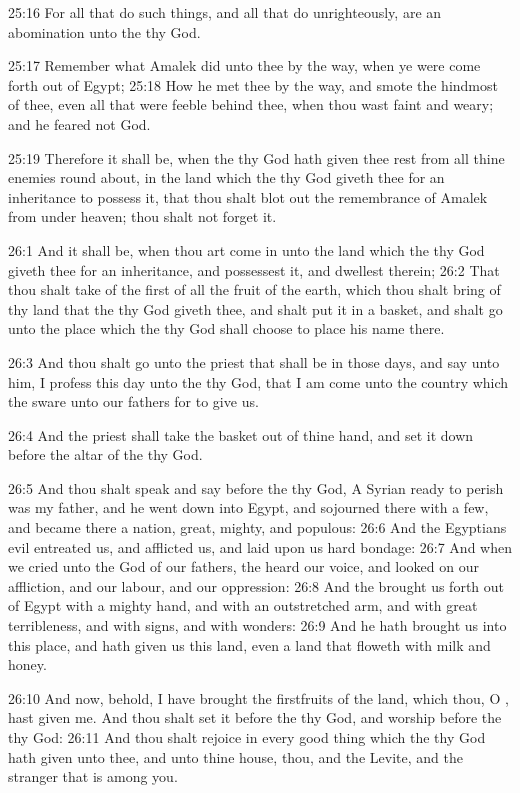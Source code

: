 25:16 For all that do such things, and all that do unrighteously, are
an abomination unto the \LORD thy God.

25:17 Remember what Amalek did unto thee by the way, when ye were come
forth out of Egypt; 25:18 How he met thee by the way, and smote the
hindmost of thee, even all that were feeble behind thee, when thou
wast faint and weary; and he feared not God.

25:19 Therefore it shall be, when the \LORD thy God hath given thee
rest from all thine enemies round about, in the land which the \LORD
thy God giveth thee for an inheritance to possess it, that thou shalt
blot out the remembrance of Amalek from under heaven; thou shalt not
forget it.

26:1 And it shall be, when thou art come in unto the land which the
\LORD thy God giveth thee for an inheritance, and possessest it, and
dwellest therein; 26:2 That thou shalt take of the first of all the
fruit of the earth, which thou shalt bring of thy land that the \LORD
thy God giveth thee, and shalt put it in a basket, and shalt go unto
the place which the \LORD thy God shall choose to place his name there.

26:3 And thou shalt go unto the priest that shall be in those days,
and say unto him, I profess this day unto the \LORD thy God, that I am
come unto the country which the \LORD sware unto our fathers for to
give us.

26:4 And the priest shall take the basket out of thine hand, and set
it down before the altar of the \LORD thy God.

26:5 And thou shalt speak and say before the \LORD thy God, A Syrian
ready to perish was my father, and he went down into Egypt, and
sojourned there with a few, and became there a nation, great, mighty,
and populous: 26:6 And the Egyptians evil entreated us, and afflicted
us, and laid upon us hard bondage: 26:7 And when we cried unto the
\LORD God of our fathers, the \LORD heard our voice, and looked on our
affliction, and our labour, and our oppression: 26:8 And the \LORD
brought us forth out of Egypt with a mighty hand, and with an
outstretched arm, and with great terribleness, and with signs, and
with wonders: 26:9 And he hath brought us into this place, and hath
given us this land, even a land that floweth with milk and honey.

26:10 And now, behold, I have brought the firstfruits of the land,
which thou, O \LORD, hast given me. And thou shalt set it before the
\LORD thy God, and worship before the \LORD thy God: 26:11 And thou
shalt rejoice in every good thing which the \LORD thy God hath given
unto thee, and unto thine house, thou, and the Levite, and the
stranger that is among you.


